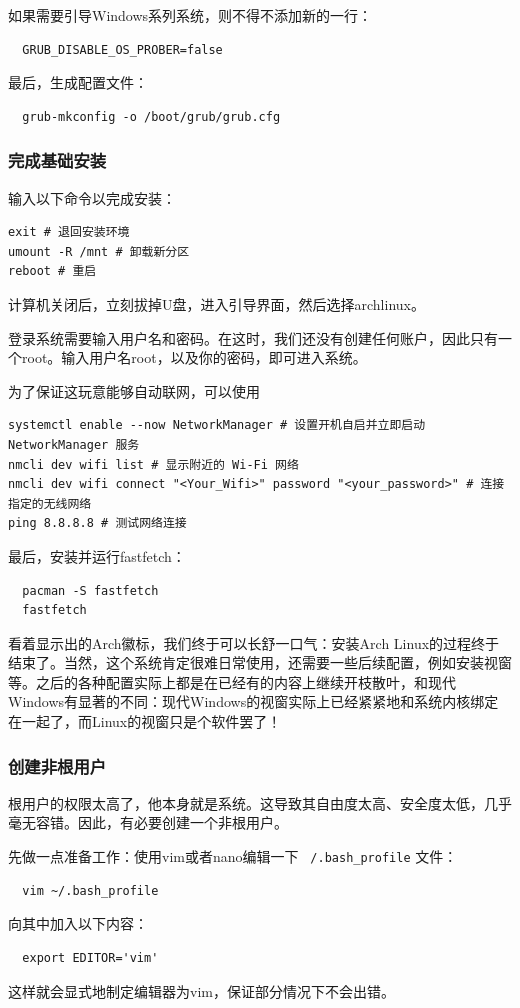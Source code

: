 如果需要引导Windows系列系统，则不得不添加新的一行：
\begin{verbatim}
  GRUB_DISABLE_OS_PROBER=false
\end{verbatim}

最后，生成配置文件：
\begin{verbatim}
  grub-mkconfig -o /boot/grub/grub.cfg
\end{verbatim}

\subsubsection{完成基础安装}

输入以下命令以完成安装：
\begin{verbatim}
exit # 退回安装环境
umount -R /mnt # 卸载新分区
reboot # 重启
\end{verbatim}
计算机关闭后，立刻拔掉U盘，进入引导界面，然后选择archlinux。

登录系统需要输入用户名和密码。在这时，我们还没有创建任何账户，因此只有一个root。输入用户名root，以及你的密码，即可进入系统。

为了保证这玩意能够自动联网，可以使用
\begin{verbatim}
systemctl enable --now NetworkManager # 设置开机自启并立即启动 NetworkManager 服务
nmcli dev wifi list # 显示附近的 Wi-Fi 网络
nmcli dev wifi connect "<Your_Wifi>" password "<your_password>" # 连接指定的无线网络
ping 8.8.8.8 # 测试网络连接
\end{verbatim}

最后，安装并运行fastfetch：
\begin{verbatim}
  pacman -S fastfetch
  fastfetch
\end{verbatim}
看着显示出的Arch徽标，我们终于可以长舒一口气：安装Arch Linux的过程终于结束了。当然，这个系统肯定很难日常使用，还需要一些后续配置，例如安装视窗等。之后的各种配置实际上都是在已经有的内容上继续开枝散叶，和现代Windows有显著的不同：现代Windows的视窗实际上已经紧紧地和系统内核绑定在一起了，而Linux的视窗只是个软件罢了！

\subsubsection{创建非根用户}

根用户的权限太高了，他本身就是系统。这导致其自由度太高、安全度太低，几乎毫无容错。因此，有必要创建一个非根用户。

先做一点准备工作：使用vim或者nano编辑一下 \texttt{~/.bash\_profile} 文件：
\begin{verbatim}
  vim ~/.bash_profile
\end{verbatim}
向其中加入以下内容：
\begin{verbatim}
  export EDITOR='vim'
\end{verbatim}
这样就会显式地制定编辑器为vim，保证部分情况下不会出错。

